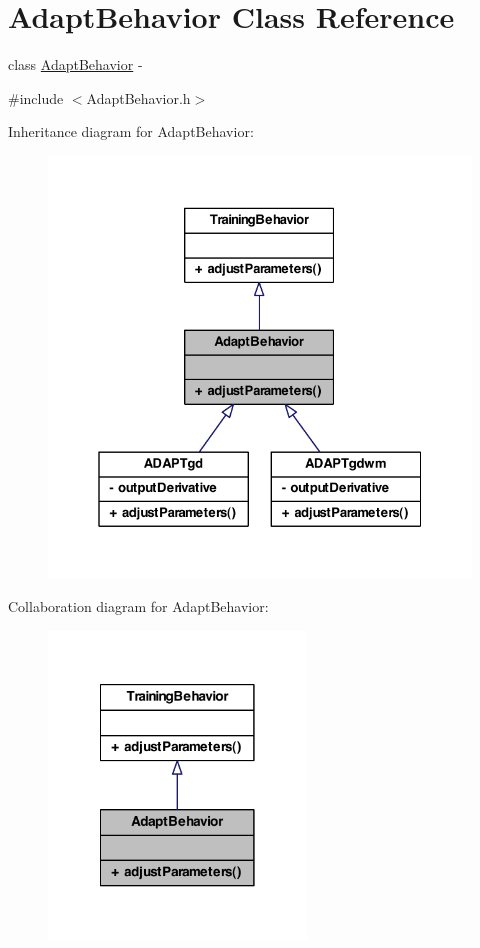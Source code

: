 \hypertarget{class_adapt_behavior}{
\section{AdaptBehavior Class Reference}
\label{class_adapt_behavior}
}


class \hyperlink{class_adapt_behavior}{AdaptBehavior} -\/  




{\ttfamily \#include $<$AdaptBehavior.h$>$}



Inheritance diagram for AdaptBehavior:
\nopagebreak
\begin{figure}[H]
\begin{center}
\leavevmode
\includegraphics[width=327pt]{class_adapt_behavior__inherit__graph}
\end{center}
\end{figure}


Collaboration diagram for AdaptBehavior:
\nopagebreak
\begin{figure}[H]
\begin{center}
\leavevmode
\includegraphics[width=194pt]{class_adapt_behavior__coll__graph}
\end{center}
\end{figure}
